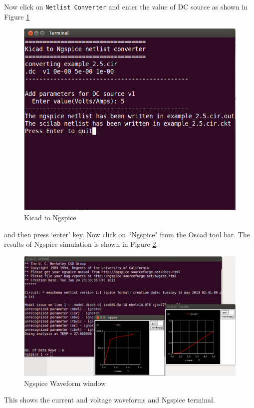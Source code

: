\begin{enumerate}
Now click on {\tt Netlist Converter} and enter the value of DC source as shown in Figure \ref{apd13} 
\begin{figure}
\begin{center}
\includegraphics[width=1\linewidth]{figures/apd13.png}
\caption{Kicad to Ngspice}
\label{apd13}
\end{center}
\end{figure}
and then press `enter' key. Now click on ``Ngspice" from the Oscad tool bar. The results of Ngspice simulation is shown in Figure \ref{apd14}.
\begin{figure}
\begin{center}
\includegraphics[width=1\linewidth]{figures/apd14.png}
\caption{Ngspice Waveform window}
\label{apd14}
\end{center}
\end{figure}
This shows the current and voltage waveforms and Ngspice terminal.
\end{enumerate}
